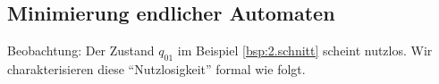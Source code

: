 \subsection{Minimierung endlicher Automaten}

% 
% 

Beobachtung: Der Zustand $q_{01}$ im Beispiel \ref{bsp:2.schnitt} scheint nutzlos. Wir charakterisieren diese ``Nutzlosigkeit'' formal wie folgt.

